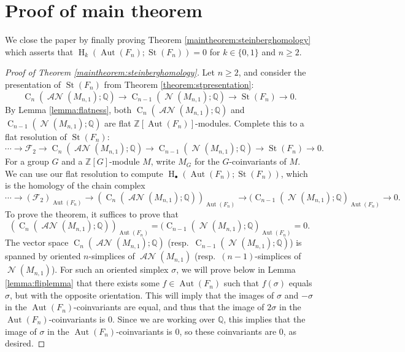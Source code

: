 \documentclass[11pt]{amsart}
\numberwithin{equation}{section}
\theoremstyle{plain}
\theoremstyle{definition}
\theoremstyle{remark}
\newcommand\Z{\ensuremath{\mathbb{Z}}}
\newcommand\Q{\ensuremath{\mathbb{Q}}}
\DeclareMathOperator{\HH}{H}
\DeclareMathOperator{\CC}{C}
\DeclareMathOperator{\Aut}{Aut}
\newcommand\cF{\ensuremath{\mathcal{F}}}
\DeclareMathOperator{\St}{St}
\DeclareMathOperator{\NSpheres}{\mathcal{N}}
\DeclareMathOperator{\ANSpheres}{\mathcal{AN}}
\begin{document}
\section{Proof of main theorem}
\label{section:mainproof}

We close the paper by finally proving Theorem \ref{maintheorem:steinberghomology} which asserts
that $\HH_k(\Aut(F_n);\St(F_n)) = 0$ for $k \in \{0,1\}$ and $n \geq 2$.

\begin{proof}[Proof of Theorem \ref{maintheorem:steinberghomology}]
Let $n \geq 2$, and consider the presentation of $\St(F_n)$ from Theorem \ref{theorem:stpresentation}:
\[\CC_n(\ANSpheres(M_{n,1});\Q) \to \CC_{n-1}(\NSpheres(M_{n,1});\Q) \to \St(F_n) \to 0.\]
By Lemma \ref{lemma:flatness}, both $\CC_n(\ANSpheres(M_{n,1});\Q)$ and $\CC_{n-1}(\NSpheres(M_{n,1});\Q)$ are flat
$\Z[\Aut(F_n)]$-modules.  Complete this to a flat resolution of $\St(F_n)$:
\[\cdots \rightarrow \cF_2 \rightarrow \CC_n(\ANSpheres(M_{n,1});\Q) \rightarrow \CC_{n-1}(\NSpheres(M_{n,1});\Q) \rightarrow \St(F_n) \rightarrow 0.\]
For a group $G$ and a $\Z[G]$-module $M$, write $M_G$ for the $G$-coinvariants of $M$.  We can use our flat
resolution to compute $\HH_{\bullet}(\Aut(F_n);\St(F_n))$, which is the homology of the chain complex
\[\cdots \rightarrow (\cF_2)_{\Aut(F_n)} \rightarrow (\CC_n(\ANSpheres(M_{n,1});\Q))_{\Aut(F_n)} \rightarrow (\CC_{n-1}(\NSpheres(M_{n,1});\Q)_{\Aut(F_n)} \rightarrow 0.\]
To prove the theorem, it suffices to prove that
\[(\CC_n(\ANSpheres(M_{n,1});\Q))_{\Aut(F_n)} = (\CC_{n-1}(\NSpheres(M_{n,1});\Q)_{\Aut(F_n)} = 0.\]
The vector space $\CC_n(\ANSpheres(M_{n,1});\Q)$ (resp.\ $\CC_{n-1}(\NSpheres(M_{n,1});\Q)$)
is spanned by oriented $n$-simplices of $\ANSpheres(M_{n,1})$ (resp.\ $(n-1)$-simplices of $\NSpheres(M_{n,1})$).
For such an oriented simplex $\sigma$, we will prove below in Lemma \ref{lemma:fliplemma} that there exists
some $f \in \Aut(F_n)$ such that $f(\sigma)$ equals $\sigma$, but with the opposite orientation.  This will imply
that the images of $\sigma$ and $-\sigma$ in the $\Aut(F_n)$-coinvariants are equal, and thus that the image
of $2\sigma$ in the $\Aut(F_n)$-coinvariants is $0$.  Since we are working over $\Q$, this implies that the
image of $\sigma$ in the $\Aut(F_n)$-coinvariants is $0$, so these coinvariants are $0$, as desired.
\end{proof}
\end{document}
